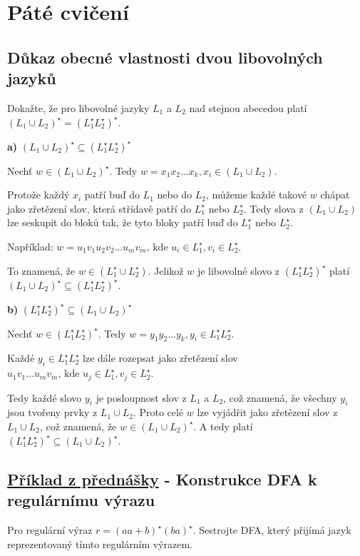 \section{Páté cvičení}

\subsection{Důkaz obecné vlastnosti dvou libovolných jazyků}
Dokažte, že pro libovolné jazyky $L_1$ a $L_2$ nad stejnou abecedou platí $(L_1 \cup L_2)^\star = (L_1^\star L_2^\star)^\star$.

\textbf{a)} $(L_1 \cup L_2)^\star \subseteq (L_1^\star L_2^\star)^\star$

Nechť $w \in (L_1 \cup L_2)^\star$. Tedy $w = x_1 x_2 \dots x_k, x_i \in (L_1 \cup L_2)$.

Protože každý $x_i$ patří buď do $L_1$ nebo do $L_2$, můžeme každé takové $w$ chápat jako zřetězení slov, která střídavě
patří do $L_1^\star$ nebo $L_2^\star$. Tedy slova z $(L_1 \cup L_2)$ lze seskupit do bloků tak, že tyto bloky patří buď do
$L_1^\star$ nebo $L_2^\star$.

Například: $w = u_1 v_1 u_2 v_2 \dots u_m v_m \text{, kde } u_i \in L_1^\star, v_i \in L_2^\star$.

To znamená, že $w \in (L_1^\star \cup L_2^\star)$. Jelikož $w$ je libovolné slovo z $(L_1^\star L_2^\star)^\star$ platí
$(L_1 \cup L_2)^\star \subseteq (L_1^\star L_2^\star)^\star$.

\textbf{b)} $(L_1^\star L_2^\star)^\star \subseteq (L_1 \cup L_2)^\star$

Nechť $w \in (L_1^\star L_2^\star)^\star$. Tedy $w = y_1 y_2 \dots y_k, y_i \in L_1^\star L_2^\star$.

Každé $y_i \in L_1^\star L_2^\star$ lze dále rozepsat jako zřetězení slov $u_1 v_1 \dots u_m v_m \text{, kde } u_j \in 
L_1^\star, v_j \in L_2^\star$.

Tedy každé slovo $y_i$ je posloupnost slov z $L_1$ a $L_2$, což znamená, že všechny $y_i$ jsou tvořeny prvky z $L_1 \cup L_2$.
Proto celé $w$ lze vyjádřit jako zřetězení slov z $L_1 \cup L_2$, což znamená, že $w \in (L_1 \cup L_2)^\star$. A tedy
platí $(L_1^\star L_2^\star)^\star \subseteq (L_1 \cup L_2)^\star$.

\subsection{\href{https://youtu.be/k-56qYErqJY?list=PLQL6z4JeTTQkLuzI78OTnfYBclE1g0UjS&t=4688}{Příklad z přednášky} - Konstrukce DFA k regulárnímu výrazu}
Pro regulární výraz $r = (aa + b)^\star (ba)^\star$. Sestrojte DFA, který přijímá jazyk reprezentovaný tímto regulárním
výrazem.

